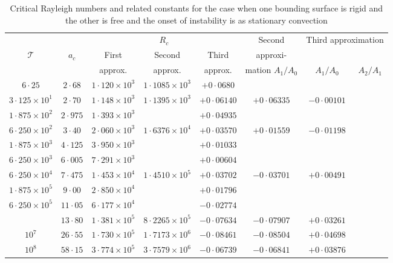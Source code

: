 \begin{table}[ht]
\centering
\caption{Critical Rayleigh numbers and related constants for the case when one bounding surface is rigid and the other is free and the onset of instability is as stationary convection}
\label{tab:IX}
\begin{tabular}{cccccccc}
\hline
& & \multicolumn{3}{c}{$R_c$} & \multicolumn{1}{c}{Second} & \multicolumn{2}{c}{Third approximation} \\
\cline{3-5}\cline{7-8}
$\mathscr{T}$ & $a_c$ & First & Second & Third & approxi- & & \\
& & approx. & approx. & approx. & mation $A_1/A_0$ & $A_1/A_0$ & $A_2/A_1$ \\
\hline
$6{\cdot}25$ & $2{\cdot}68$ & $1{\cdot}120\times10^3$ & $1{\cdot}1085\times10^3$ & $+0{\cdot}0680$ & & \\
$3{\cdot}125\times10^1$ & $2{\cdot}70$ & $1{\cdot}148\times10^3$ & $1{\cdot}1395\times10^3$ & $+0{\cdot}06140$ & $+0{\cdot}06335$ & $-0{\cdot}00101$ \\
$1{\cdot}875\times10^2$ & $2{\cdot}975$ & $1{\cdot}393\times10^3$ & & $+0{\cdot}04935$ & & \\
$6{\cdot}250\times10^2$ & $3{\cdot}40$ & $2{\cdot}060\times10^3$ & $1{\cdot}6376\times10^4$ & $+0{\cdot}03570$ & $+0{\cdot}01559$ & $-0{\cdot}01198$ \\
$1{\cdot}875\times10^3$ & $4{\cdot}125$ & $3{\cdot}950\times10^3$ & & $+0{\cdot}01033$ & & \\
$6{\cdot}250\times10^3$ & $6{\cdot}005$ & $7{\cdot}291\times10^3$ & & $+0{\cdot}00604$ & & \\
$6{\cdot}250\times10^4$ & $7{\cdot}475$ & $1{\cdot}453\times10^4$ & $1{\cdot}4510\times10^5$ & $+0{\cdot}03702$ & $-0{\cdot}03701$ & $+0{\cdot}00491$ \\
$1{\cdot}875\times10^5$ & $9{\cdot}00$ & $2{\cdot}850\times10^4$ & & $+0{\cdot}01796$ & & \\
$6{\cdot}250\times10^5$ & $11{\cdot}05$ & $6{\cdot}177\times10^4$ & & $-0{\cdot}02774$ & & \\
& $13{\cdot}80$ & $1{\cdot}381\times10^5$ & $8{\cdot}2265\times10^5$ & $-0{\cdot}07634$ & $-0{\cdot}07907$ & $+0{\cdot}03261$ \\
$10^7$ & $26{\cdot}55$ & $1{\cdot}730\times10^5$ & $1{\cdot}7173\times10^6$ & $-0{\cdot}08461$ & $-0{\cdot}08504$ & $+0{\cdot}04698$ \\
$10^8$ & $58{\cdot}15$ & $3{\cdot}774\times10^5$ & $3{\cdot}7579\times10^6$ & $-0{\cdot}06739$ & $-0{\cdot}06841$ & $+0{\cdot}03876$ \\
\hline
\end{tabular}
\end{table}


